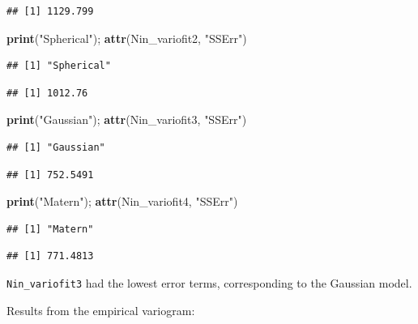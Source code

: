 \documentclass[
]{book}
\newenvironment{Shaded}{\begin{snugshade}}{\end{snugshade}}
\newcommand{\FunctionTok}[1]{\textcolor[rgb]{0.13,0.29,0.53}{\textbf{#1}}}
\newcommand{\NormalTok}[1]{#1}
\newcommand{\StringTok}[1]{\textcolor[rgb]{0.31,0.60,0.02}{#1}}
\begin{document}
\begin{verbatim}
## [1] 1129.799
\end{verbatim}

\begin{Shaded}
\begin{Highlighting}[]
\FunctionTok{print}\NormalTok{(}\StringTok{"Spherical"}\NormalTok{); }\FunctionTok{attr}\NormalTok{(Nin\_variofit2, }\StringTok{"SSErr"}\NormalTok{)}
\end{Highlighting}
\end{Shaded}

\begin{verbatim}
## [1] "Spherical"
\end{verbatim}

\begin{verbatim}
## [1] 1012.76
\end{verbatim}

\begin{Shaded}
\begin{Highlighting}[]
\FunctionTok{print}\NormalTok{(}\StringTok{"Gaussian"}\NormalTok{); }\FunctionTok{attr}\NormalTok{(Nin\_variofit3, }\StringTok{"SSErr"}\NormalTok{)}
\end{Highlighting}
\end{Shaded}

\begin{verbatim}
## [1] "Gaussian"
\end{verbatim}

\begin{verbatim}
## [1] 752.5491
\end{verbatim}

\begin{Shaded}
\begin{Highlighting}[]
\FunctionTok{print}\NormalTok{(}\StringTok{"Matern"}\NormalTok{); }\FunctionTok{attr}\NormalTok{(Nin\_variofit4, }\StringTok{"SSErr"}\NormalTok{)}
\end{Highlighting}
\end{Shaded}

\begin{verbatim}
## [1] "Matern"
\end{verbatim}

\begin{verbatim}
## [1] 771.4813
\end{verbatim}

\texttt{Nin\_variofit3} had the lowest error terms, corresponding to the Gaussian model.

Results from the empirical variogram:
\end{document}
